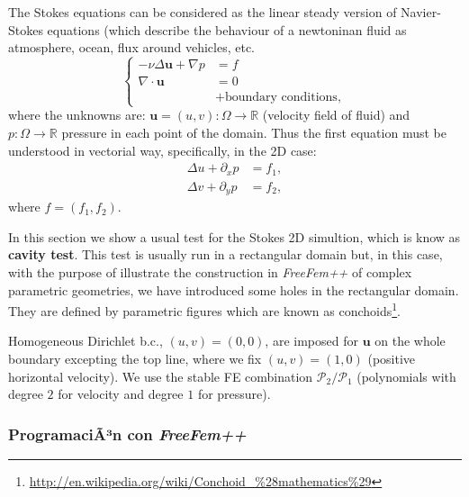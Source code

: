 \documentclass[12pt]{article}
\newcommand{\FF}{\textit{FreeFem++}\xspace}
\renewcommand{\P}{\mathcal{P}_}
\newcommand{\R}{{\mathbb R}}
\begin{document}
The Stokes equations can be considered as the linear steady version of
Navier-Stokes equations (which describe the behaviour of a newtoninan
fluid as atmosphere, ocean, flux around vehicles, etc.
\begin{equation*}
  \left\{
  \begin{aligned}
    -\nu\Delta \mathbf{u}+ \nabla p &= f
    \\
    \nabla\cdot \mathbf{u} & = 0
    \\ & + \text{boundary conditions},
  \end{aligned}
  \right.
\end{equation*}
where the unknowns are: $\mathbf{u}=(u,v):\Omega\to\R$ (velocity field
of fluid) and $p:\Omega\to\R$ pressure in each point of the domain.
Thus the first equation must be understood in vectorial way,
specifically, in the 2D case:
\begin{align*}
  \Delta u + \partial_x p &= f_1, \\
  \Delta v + \partial_y p &= f_2,
\end{align*}
where  $f=(f_1,f_2)$.

In this section we show a usual test for the Stokes 2D simultion,
which is know as \textbf{cavity test}. This test is usually run in a
rectangular domain but, in this case, with the purpose of illustrate
the construction in \FF of complex parametric geometries, we have
introduced some holes in the rectangular domain. They are defined by
parametric figures which are known as
conchoids\footnote{\url{http://en.wikipedia.org/wiki/Conchoid_\%28mathematics\%29}}.

Homogeneous Dirichlet b.c., $(u,v)=(0,0)$, are imposed for
$\mathbf{u}$ on the whole boundary excepting the top line, where we
fix $(u,v)=(1,0)$  (positive horizontal velocity). We use the stable
FE combination  $\P2/\P1$ (polynomials with degree $2$ for velocity
and degree $1$ for pressure).

\subsubsection{ProgramaciÃ³n con \FF}
\end{document}
